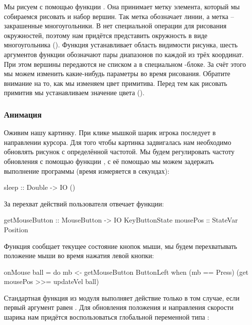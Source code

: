 
Мы рисуем с помощью функции . Она принимает
метку элемента, который мы собираемся рисовать и набор вершин.
Так метка  обозначает линии, а метка  --
закрашенные многоугольники. В  нет специальной
операции для рисования окружностей, поэтому нам придётся
представить окружность в виде многоугольника (). 
Функция  устанавливает область видимости рисунка,
шесть аргументов функции обозначают пары диапазонов по каждой
из трёх координат. При этом вершины передаются
не списком а в специальном -блоке. За счёт этого
мы можем изменить какие-нибудь параметры  во
время рисования. Обратите внимание на то, как мы изменяем
цвет примитива. Перед тем как рисовать примитив мы устанавливаем
значение цвета (). 

\subsubsection{Анимация}

Оживим нашу картинку. При клике мышкой шарик игрока 
последует в направлении курсора. Для того чтобы картинка
задвигалась нам необходимо обновлять рисунок с определённой частотой.
Мы будем регулировать частоту обновления с помощью функции
, с её помощью мы можем задержать выполнение программы
(время измеряется в секундах):

\begin{code}
sleep :: Double -> IO ()
\end{code}

За перехват действий пользователя отвечает функции:

\begin{code}
getMouseButton  :: MouseButton -> IO KeyButtonState
mousePos        :: StateVar Position
\end{code}

Функция  сообщает текущее состояние
кнопок мыши, мы будем перехватывать положение мыши
во время нажатия левой кнопки:

\begin{code}
onMouse ball = do
    mb <- getMouseButton ButtonLeft
    when (mb == Press) (get mousePos >>= updateVel ball)
\end{code}

Стандартная функция  из модуля 
выполняет действие только в том случае, если первый аргумент
равен .
Для обновления положения и направления скорости шарика
нам придётся воспользоваться глобальной переменной типа 
:

